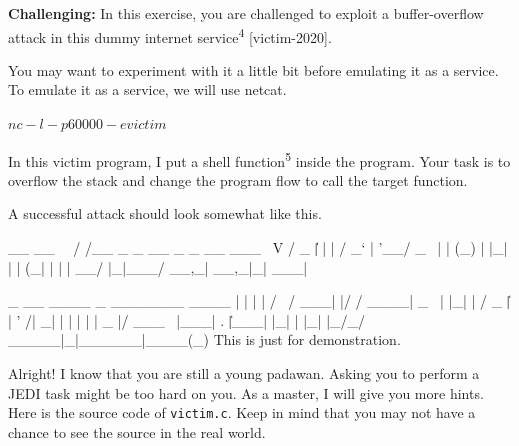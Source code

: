 \documentclass[a4paper, 10pt]{article}
\begin{document}

\newpage


\begin{problem}
\textbf{Challenging:} In this exercise, you are challenged to exploit a buffer-overflow attack in this dummy internet service\textsuperscript{4} [victim-2020].


\myspace

\noindent You may want to experiment with it a little bit before emulating it as a service.
To emulate it as a service, we will use netcat.

\begin{codingbox}
$ nc -l -p 60000 -e victim
$
\end{codingbox}

\noindent In this victim program, I put a shell function\textsuperscript{5} inside the program.
Your task is to overflow the stack and change the program flow to call the target function.


\myspace

\noindent A successful attack should look somewhat like this.

\begin{codingbox}[language=bash]
__   __
\ \ / /__  _   _   __ _ _ __ ___
 \ V / _ \| | | |  / _` | '__/ _ \
  | | (_) | |_| | | (_| | | |  __/
  |_|\___/ \__,_|  \__,_|_|  \___|

 _   __     ____ _  _______ ____
| | | |  / \  / ___| |/ / ____|  _ \
| |_| | / _ \| |   | ' /|  _| | | | |
|  _  |/ ___ \ |___| . \| |___| |_| |
|_| |_/_/   \_\____|_|\_\_____|____(_)
This is just for demonstration.
\end{codingbox}

\noindent Alright! I know that you are still a young padawan.
Asking you to perform a JEDI task might be too hard on you.
As a master, I will give you more hints.
Here is the source code of \texttt{victim.c}.
Keep in mind that you may not have a chance to see the source in the real world.


\end{problem}
\end{document}
